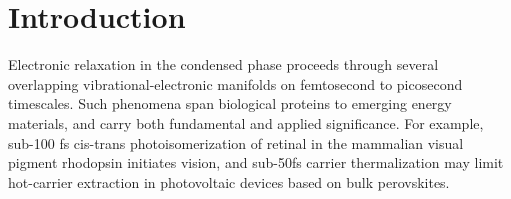 \documentclass[%
aip,
amsmath,amssymb,
preprint,%
]{revtex4-2}
\newcommand*{\si}[1]{\textcolor{black}{ #1}}
\begin{document}
\maketitle



\section{Introduction}\label{intro}
Electronic relaxation in the condensed phase proceeds through several overlapping vibrational-electronic manifolds on femtosecond to picosecond timescales. Such phenomena span biological proteins to emerging energy materials, and carry both fundamental and applied significance. For example, sub-100 fs cis-trans photoisomerization of retinal\cite{Mathies1991} in the mammalian visual pigment rhodopsin initiates vision, and sub-50fs carrier thermalization\cite{Richter2017} may limit hot-carrier extraction in photovoltaic devices based on bulk perovskites. \\
\end{document}
